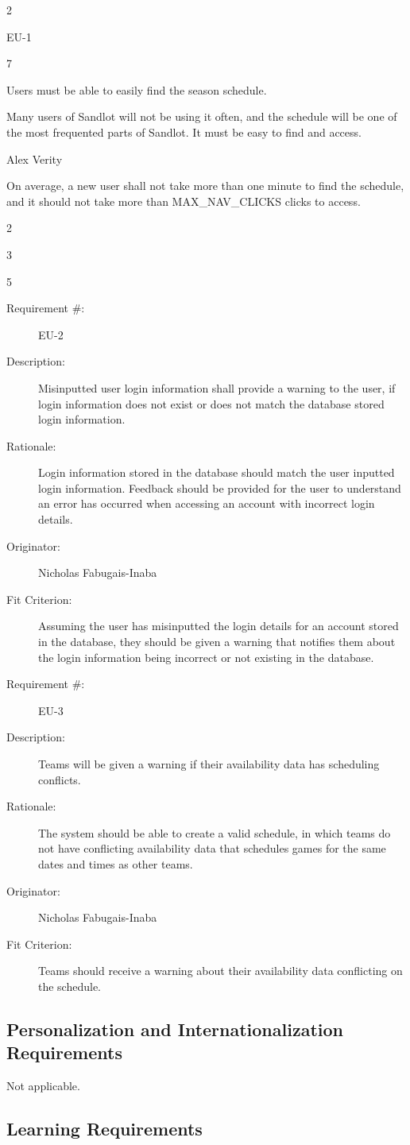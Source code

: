 \documentclass[12pt]{article}
\newenvironment{myreq}[1]{%
\setlist[description]{font=\normalfont\color{darkgray}}%
\begin{tcolorbox}[colframe=black,colback=white, sharp corners, boxrule=1pt]%
\bfseries\color{blue}%
\begin{description}#1}%
{\end{description}\end{tcolorbox}}
\newcommand{\twoinline}[2]{\begin{multicols}{2}#1 #2\end{multicols}}
\newcommand{\reqno}{\item[Requirement \#:]}
\newcommand{\reqevent}{\item[Event/BUC/PUC \#:]}
\newcommand{\reqdesc}{\item[Description:]}
\newcommand{\reqrat}{\item[Rationale:]}
\newcommand{\reqorig}{\item[Originator:]}
\newcommand{\reqfit}{\item[Fit Criterion:]}
\newcommand{\reqsatis}{\item[Customer Satisfaction:]}
\newcommand{\reqdissat}{\item[Customer Dissatisfaction:]}
\begin{document}
\begin{myreq}
  \twoinline
    {\reqno EU-1}
    {\reqevent 7}
  \reqdesc Users must be able to easily find the season schedule.
  \reqrat Many users of Sandlot will not be using it often, and the
  schedule will be one of the most frequented parts of Sandlot. It must be
  easy to find and access. 
  \reqorig Alex Verity
  \reqfit On average, a new user shall not take more than one minute to find
  the schedule, and it should not take more than MAX\_NAV\_CLICKS clicks to
  access.
  \twoinline
    {\reqsatis 3}
    {\reqdissat 5}
\end{myreq}

\begin{myreq}
  \reqno EU-2
  \reqdesc Misinputted user login information shall provide a warning to the
  user, if login information does not exist or does not match the database
  stored login information.
  \reqrat Login information stored in the database should match the user
  inputted login information. Feedback should be provided for the user to
  understand an error has occurred when accessing an account with incorrect
  login details.
  \reqorig Nicholas Fabugais-Inaba
  \reqfit Assuming the user has misinputted the login details for
  an account stored in the database, they should be given a warning that
  notifies them about the login information being incorrect or not existing
  in the database.
  \twoinline
    {\reqsatis 3}
    {\reqdissat 5}
\end{myreq}

\begin{myreq}
  \reqno EU-3
  \reqdesc Teams will be given a warning if their availability data has
  scheduling conflicts.
  \reqrat The system should be able to create a valid schedule, in which
  teams do not have conflicting availability data that schedules games for
  the same dates and times as other teams.
  \reqorig Nicholas Fabugais-Inaba
  \reqfit Teams should receive a warning about their availability data
  conflicting on the schedule.
  \twoinline
    {\reqsatis 3}
    {\reqdissat 5}
\end{myreq}

\subsection{Personalization and Internationalization Requirements}
Not applicable.

\subsection{Learning Requirements}
\end{document}
